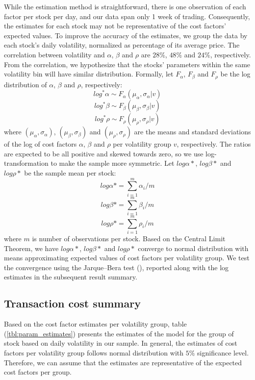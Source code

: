 While the estimation method is straightforward, there is one observation of each factor per stock per day, and our data span only 1 week of trading. Consequently, the estimates for each stock may not be representative of the cost factors' expected values. To improve the accuracy of the estimates, we group the data by each stock's daily volatility, normalized as percentage of its average price. The correlation between volatility and $\alpha$, $\beta$ and $\rho$ are $28\%$, $48\%$ and $24\%$, respectively. From the correlation, we hypothesize that the stocks' parameters within the same volatility bin will have similar distribution. Formally, let $F_\alpha$, $F_\beta$ and $F_\rho$ be the log distribution of $\alpha$, $\beta$ and $\rho$, respectively:
\[
  log^* \alpha \sim F_\alpha(\mu_\alpha,\sigma_\alpha|v)
\]
\[
  log^* \beta \sim F_\beta(\mu_\beta,\sigma_\beta|v)
\]
\[
  log^* \rho \sim F_\rho(\mu_\rho,\sigma_\rho|v)
\]
where $(\mu_\alpha,\sigma_\alpha)$, $(\mu_\beta,\sigma_\beta)$ and $(\mu_\rho,\sigma_\rho)$ are the means and standard deviations of the log of cost factors $\alpha$, $\beta$ and $\rho$ per volatility group $v$, respectively. The ratios are expected to be all positive and skewed towards zero, so we use log-transformation to make the sample more symmetric. Let $log \alpha*$, $log \beta*$ and $log \rho*$ be the sample mean per stock:
\[
  log \alpha* = \sum_{i=1}^m \alpha_i/m
\]
\[
  log \beta* = \sum_{i=1}^m \beta_i/m
\]
\[
  log \rho* = \sum_{i=1}^m \rho_i/m
\]
where $m$ is number of observations per stock. Based on the Central Limit Theorem, we have $log \alpha*$, $log \beta*$ and $log \rho*$ converge to normal distribution with means approximating expected values of cost factors per volatility group. We test the convergence using the Jarque–Bera test (\cite{JarqueBera1980}), reported along with the log estimates in the subsequent result summary.

\subsection{Transaction cost summary}

Based on the cost factor estimates per volatility group, table (\ref{tbl:param_estimates}) presents the estimates of the model for the group of stock based on daily volatility in our sample. In general, the estimates of cost factors per volatility group follows normal distribution with $5\%$ significance level. Therefore, we can assume that the estimates are representative of the expected cost factors per group.

